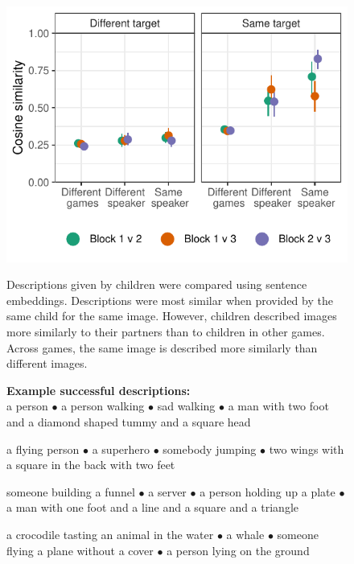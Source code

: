 \documentclass[11pt,a4paper]{article}
\begin{document}
\begin{figure}
\begin{minipage}{.5\textwidth}
		\end{minipage}
		~~~
		\begin{minipage}{.5\textwidth}	
		{\includegraphics[width=\textwidth]{sims.pdf}} 
		\begin{small}
		Descriptions given by children were compared using sentence embeddings. Descriptions were most similar when provided by the same child for the same image. However, children described images more similarly to their partners than to children in other games.  Across games, the same image is described more similarly than different images.
		\end{small}
		
		\bigskip
		\begin{small}
\textbf{\centering Example successful descriptions:\\}
\smallskip
		a person $\bullet$ a person walking $\bullet$ sad walking  $\bullet$ a man with two foot and a diamond shaped tummy and a square head
		
		\smallskip
		a flying person $\bullet$
		a superhero $\bullet$
		somebody jumping $\bullet$ two wings with a square in the back with two feet
		\smallskip
		
		someone building a funnel $\bullet$
		a server $\bullet$
		a person holding up a plate $\bullet$ a man with one foot and a line and a square and a triangle
		\smallskip
		
		a crocodile tasting an animal in the water $\bullet$
		a whale $\bullet$
		someone flying a plane without a cover $\bullet$
		a person lying on the ground
		
		\end{small}
		\end{minipage}
	\end{figure}
\end{document}
